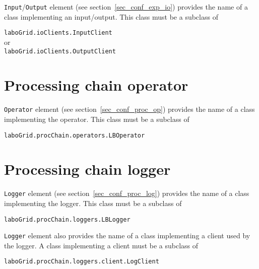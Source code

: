 \verb|Input|/\verb|Output| element (see section~\ref{sec_conf_exp_io})
provides the name of a class implementing an input/output. This class must be a
subclass of
\begin{center}
\texttt{laboGrid.ioClients.InputClient}\\
or\\
\texttt{laboGrid.ioClients.OutputClient}
\end{center}

\section{Processing chain operator}

\verb|Operator| element (see section~\ref{sec_conf_proc_op}) provides the
name of a class implementing the operator. This class must be a subclass of
\begin{center}
\texttt{laboGrid.procChain.operators.LBOperator}
\end{center}


\section{Processing chain logger}
\label{sec_ext_log}

\verb|Logger| element (see section~\ref{sec_conf_proc_log}) provides the
name of a class implementing the logger. This class must be a subclass of
\begin{center}
\texttt{laboGrid.procChain.loggers.LBLogger}
\end{center}

\verb|Logger| element also provides the name of a class implementing a client
used by the logger. A class implementing a client must be a subclass of
\begin{center}
\texttt{laboGrid.procChain.loggers.client.LogClient}
\end{center}
